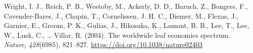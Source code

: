 \documentclass[
  12pt,
  a4paper,
]{article}
\newlength{\cslhangindent}
\newlength{\cslentryspacingunit} %
\newenvironment{CSLReferences}[2] %
 {%
  \setlength{\parindent}{0pt}
  \ifodd #1
  \let\oldpar\par
  \def\par{\hangindent=\cslhangindent\oldpar}
  \fi
  \setlength{\parskip}{#2\cslentryspacingunit}
 }%
 {}
\begin{document}
\begin{CSLReferences}{1}{0}
\leavevmode{}%
Wright, I. J., Reich, P. B., Westoby, M., Ackerly, D. D., Baruch, Z., Bongers, F., Cavender-Bares, J., Chapin, T., Cornelissen, J. H. C., Diemer, M., Flexas, J., Garnier, E., Groom, P. K., Gulias, J., Hikosaka, K., Lamont, B. B., Lee, T., Lee, W., Lusk, C., \ldots{} Villar, R. (2004). The worldwide leaf economics spectrum. \emph{Nature}, \emph{428}(6985), 821--827. \url{https://doi.org/10.1038/nature02403}

\end{CSLReferences}
\end{document}
